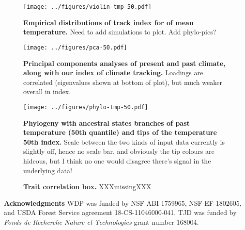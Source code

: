 \documentclass[12pt]{report}
\begin{document}
\clearpage

\begin{figure}[h!]
  \begin{center}
    \texttt{[image: ../figures/violin-tmp-50.pdf]}
  \end{center}
  \caption{\doublespacing \textbf{Empirical distributions of track
      index for  of mean temperature.} Need to add simulations
    to plot. Add phylo-pics?}
  \label{pca}
\end{figure}

\begin{figure}[h!]
  \begin{center}
    \texttt{[image: ../figures/pca-50.pdf]}
  \end{center}
  \caption{\doublespacing \textbf{Principal components analyses of
      present and past climate, along with our index of climate
      tracking.} Loadings are correlated (eigenvalues shown at bottom
    of plot), but much weaker overall in index.}
  \label{pca}
\end{figure}

\begin{figure}[h!]
  \begin{center}
    \texttt{[image: ../figures/phylo-tmp-50.pdf]}
  \end{center}
  \caption{\doublespacing \textbf{Phylogeny with ancestral states
      branches of past temperature (50th quantile) and tips of the
      temperature 50th index.} Scale between the two kinds of input
    data currently is slightly off, hence no scale bar, and obviously
    the tip colours are hideous, but I think no one would disagree
    there's signal in the underlying data!}
  \label{pca}
\end{figure}


\begin{figure}[h!]
  \begin{center}
  \end{center}
  \caption{\doublespacing \textbf{Trait correlation box.}
    XXXmissingXXX}
  \label{traits}
\end{figure}

\clearpage

\textbf{Acknowledgments} WDP was funded by NSF ABI-1759965, NSF
EF-1802605, and USDA Forest Service agreement 18-CS-11046000-041. TJD
was funded by \emph{Fonds de Recherche Nature et Technologies} grant
number 168004.
\end{document}
